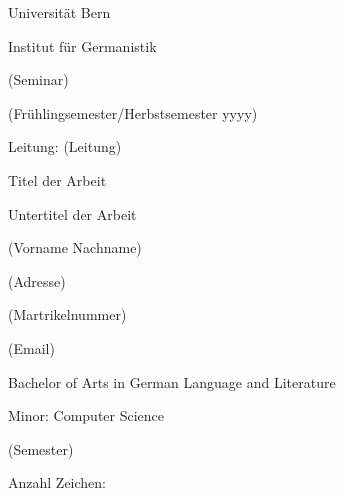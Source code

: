 \begin{titlepage}
	\begin{onehalfspace}
		\raggedright
		{\textsc\normalsize Universität Bern\par}
		{\textsc\normalsize Institut für Germanistik\par}
		{\textsc\normalsize (Seminar)\par}
		{\textsc\normalsize (Frühlingsemester/Herbstsemester yyyy)\par}
		{\textsc\normalsize Leitung: (Leitung)\par}

		\vfill
		\centering
		{\LARGE Titel der Arbeit\par}
		{\large Untertitel der Arbeit\par}	
		\vfill
		\raggedright
		{\textsc\normalsize (Vorname Nachname)\par}	
		{\textsc\normalsize (Adresse)\par}	
		{\textsc\normalsize (Martrikelnummer)\par}	
		{\textsc\normalsize (Email)\par}	
		\vspace{1cm}
		{\textsc\normalsize Bachelor of Arts in German Language and Literature\par}	
		{\textsc\normalsize Minor: Computer Science\par}	
		{\textsc\normalsize (Semester)\par}	
		\vspace{1cm}
		{\textsc\normalsize Anzahl Zeichen: \par}	
	\end{onehalfspace}
\end{titlepage}